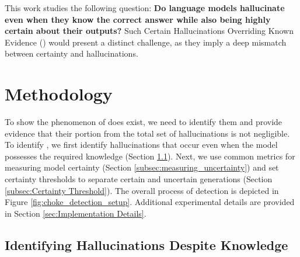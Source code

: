 This work studies the following question:
\textbf{Do language models hallucinate even when they know the correct answer while also being highly certain about their outputs?} 
Such Certain Hallucinations Overriding Known Evidence (\chk) 
 would present a distinct challenge, as they imply a deep mismatch between certainty and hallucinations.

\section{Methodology}
To show the phenomenon of \chk does exist, we need to identify them and provide evidence that their portion from the total set of hallucinations is not negligible.
To identify \chk, we first identify hallucinations that occur even when the model possesses the required knowledge (Section \ref{subsec:identifying_chk}). Next, we use common metrics for measuring model certainty (Section \ref{subsec:measuring_uncertainty}) and set certainty thresholds to separate certain and uncertain generations (Section \ref{subsec:Certainty Threshold}). The overall process of \chk detection is depicted in Figure \ref{fig:choke_detection_setup}.
Additional experimental details are provided in Section \ref{sec:Implementation Details}.



\subsection{Identifying Hallucinations Despite Knowledge}\label{subsec:identifying_chk}


